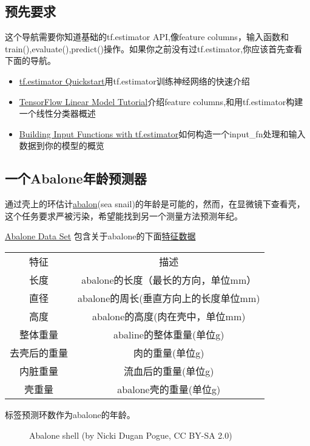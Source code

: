 \subsection{预先要求}
这个导航需要你知道基础的tf.estimator API,像feature columns，输入函数和train(),evaluate(),predict()操作。如果你之前没有过tf.estimator,你应该首先查看下面的导航。
\begin{itemize}
	\item \href{https://www.tensorflow.org/get_started/estimator}{tf.estimator Quickstart}用tf.estimator训练神经网络的快速介绍
	\item \href{https://www.tensorflow.org/tutorials/wide}{TensorFlow Linear Model Tutorial}介绍feature columns,和用tf.estimator构建一个线性分类器概述
	\item \href{https://www.tensorflow.org/get_started/input_fn}{Building Input Functions with tf.estimator}如何构造一个input\_fn处理和输入数据到你的模型的概览
\end{itemize}
\subsection{一个Abalone年龄预测器}
通过壳上的环估计\href{https://en.wikipedia.org/wiki/Abalone}{abalon}(sea snail)的年龄是可能的，然而，在显微镜下查看壳，这个任务要求严被污染，希望能找到另一个测量方法预测年纪。

\href{https://archive.ics.uci.edu/ml/datasets/Abalone}{Abalone Data Set} 包含关于abalone的下面\href{https://archive.ics.uci.edu/ml/machine-learning-databases/abalone/abalone.names}{特征数据}
\begin{table}[!h]
	\begin{tabular}{|c|c|}
特征&描述\\
长度&abalone的长度（最长的方向，单位mm）\\
直径&abalone的周长(垂直方向上的长度单位mm)\\
高度&abalone的高度(肉在壳中，单位mm)\\
整体重量&abaline的整体重量(单位g)\\
去壳后的重量&肉的重量(单位g)\\
内脏重量&流血后的重量(单位g)\\
壳重量&abalone壳的重量(单位g)\\
\end{tabular}
\end{table}
标签预测环数作为abalone的年龄。
\begin{figure}[H]
	\centering
	\caption{Abalone shell (by Nicki Dugan Pogue, CC BY-SA 2.0)}
\end{figure}

